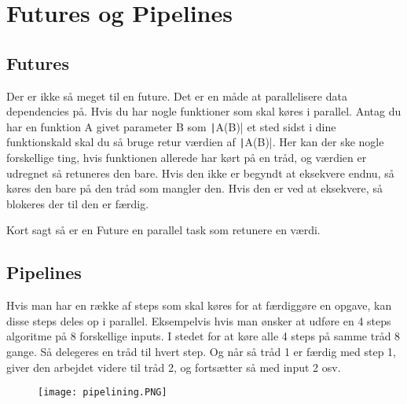 \documentclass[../SWD_disp.tex]{subfiles}
\begin{document}
\section{Futures og Pipelines}
\subsection{Futures}
Der er ikke så meget til en future. Det er en måde at parallelisere data dependencies på. Hvis du har nogle funktioner som skal køres i parallel. Antag du har en funktion A givet parameter B som \texttt|A(B)| et sted sidst i dine funktionskald skal du så bruge retur værdien af \texttt|A(B)|. Her kan der ske nogle forskellige ting, hvis funktionen allerede har kørt på en tråd, og værdien er udregnet så retuneres den bare. Hvis den ikke er begyndt at eksekvere endnu, så køres den bare på den tråd som mangler den. Hvis den er ved at eksekvere, så blokeres der til den er færdig. 

Kort sagt så er en Future en parallel task som retunere en værdi. 
\subsection{Pipelines}
Hvis man har en række af steps som skal køres for at færdiggøre en opgave, kan disse steps deles op i parallel. 
Eksempelvis hvis man ønsker at udføre en 4 steps algoritme på 8 forskellige inputs. I stedet for at køre alle 4 steps på samme tråd 8 gange. Så delegeres en tråd til hvert step. Og når så tråd 1 er færdig med step 1, giver den arbejdet videre til tråd 2, og fortsætter så med input 2 osv.

\begin{figure}[H]
    \texttt{[image: pipelining.PNG]}
\end{figure}
\end{document}
